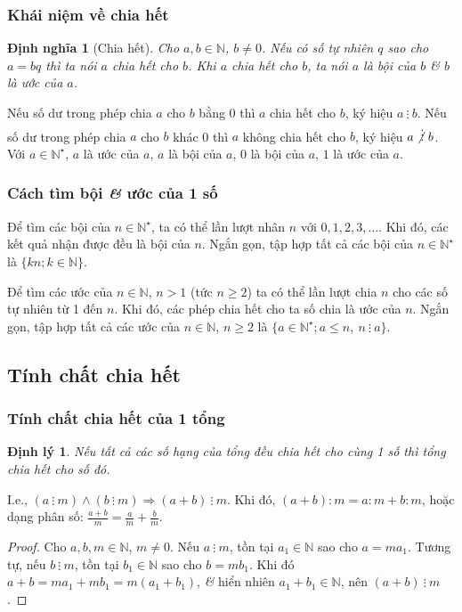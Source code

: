 \documentclass[oneside]{book}
\numberwithin{equation}{section}
\newtheorem{dinhnghia}{Định nghĩa}[section]
\newtheorem{dinhly}{Định lý}[section]
\begin{document}
\subsubsection{Khái niệm về chia hết}
\begin{dinhnghia}[Chia hết]
	Cho $a,b\in\mathbb{N}$, $b\ne 0$. Nếu có số tự nhiên $q$ sao cho $a = bq$ thì ta nói \emph{$a$ chia hết cho $b$}. Khi $a$ chia hết cho $b$, ta nói $a$ là \emph{bội} của $b$ \textit{\&} $b$ là \emph{ước} của $a$.
\end{dinhnghia}
Nếu số dư trong phép chia $a$ cho $b$ bằng 0 thì $a$ chia hết cho $b$, ký hiệu $a\ \vdots\ b$. Nếu số dư trong phép chia $a$ cho $b$ khác 0 thì $a$ không chia hết cho $b$, ký hiệu $a\not\vdots\ b$. Với $a\in\mathbb{N}^\star$, $a$ là ước của $a$, $a$ là bội của $a$, 0 là bội của $a$, $1$ là ước của $a$.

\subsubsection{Cách tìm bội \textit{\&} ước của 1 số}
Để tìm các bội của $n\in\mathbb{N}^\star$, ta có thể lần lượt nhân $n$ với $0,1,2,3,\ldots$. Khi đó, các kết quả nhận được đều là bội của $n$. Ngắn gọn, tập hợp tất cả các bội của $n\in\mathbb{N}^\star$ là $\{kn;k\in\mathbb{N}\}$.

Để tìm các ước của $n\in\mathbb{N}$, $n > 1$ (tức $n\ge 2$) ta có thể lần lượt chia $n$ cho các số tự nhiên từ 1 đến $n$. Khi đó, các phép chia hết cho ta số chia là ước của $n$. Ngắn gọn, tập hợp tất cả các ước của $n\in\mathbb{N}$, $n\ge 2$ là $\{a\in\mathbb{N}^\star;a\le n,\ n\ \vdots\ a\}$.

\subsection{Tính chất chia hết}

\subsubsection{Tính chất chia hết của 1 tổng}
\begin{dinhly}
	Nếu tất cả các số hạng của tổng đều chia hết cho cùng 1 số thì tổng chia hết cho số đó.
\end{dinhly}
I.e., $(a\ \vdots\ m)\land(b\ \vdots\ m)\Rightarrow(a + b)\ \vdots\ m$. Khi đó, $(a + b):m = a:m + b:m$, hoặc dạng phân số: $\frac{a + b}{m} = \frac{a}{m} + \frac{b}{m}$.

\begin{proof}[Proof]
	Cho $a,b,m\in\mathbb{N}$, $m\ne 0$. Nếu $a\ \vdots\ m$, tồn tại $a_1\in\mathbb{N}$ sao cho $a = ma_1$. Tương tự, nếu $b\ \vdots\ m$, tồn tại $b_1\in\mathbb{N}$ sao cho $b = mb_1$. Khi đó $a + b = ma_1 + mb_1 = m(a_1 + b_1)$, \textit{\&} hiển nhiên $a_1 + b_1\in\mathbb{N}$, nên $(a + b)\ \vdots\ m$.
\end{proof}
\end{document}
